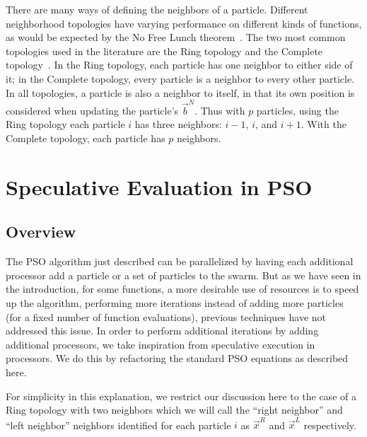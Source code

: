 \documentclass[journal,letterpaper]{IEEEtran}
\providecommand{\neigh}{\ensuremath{N}}
\providecommand{\leftind}{\ensuremath{L}}
\providecommand{\rightind}{\ensuremath{R}}
\providecommand{\nbest}{\ensuremath{\Vec{b}^\neigh}}
\providecommand{\leftn}{\ensuremath{\Vec{x}^\leftind}}
\providecommand{\rightn}{\ensuremath{\Vec{x}^\rightind}}
\begin{document}
There are many ways of defining the neighbors of a particle.  Different
neighborhood topologies have varying performance on different kinds of
functions, as would be expected by the No Free Lunch
theorem~\cite{wolpert-tec97}.
The two most common topologies used in the
literature are the Ring topology and the Complete
topology~\cite{bratton-sis07}.  In the Ring topology, each particle has one
neighbor to either side of it; in the Complete topology, every particle is a
neighbor to every other particle.  In all topologies, a particle is also a
neighbor to itself, in that its own position is considered when updating the
particle's $\nbest$.  Thus with $p$ particles, using the Ring topology each
particle $i$ has three neighbors: $i-1$, $i$, and $i+1$.  With the Complete
topology, each particle has $p$ neighbors.

\section{Speculative Evaluation in PSO}
\label{sec:sepso}
\subsection{Overview}

The PSO algorithm just described can be parallelized by having each additional
processor add a particle or a set of particles to the swarm.
But as we have seen in the introduction, for some
functions, a more desirable use of resources is to speed up the algorithm,
performing more iterations instead of adding more particles (for a fixed number of function evaluations),
previous techniques have not addressed this issue.
In order to perform additional iterations by adding additional processors, we
take inspiration from speculative execution in processors.
We do this by refactoring the standard PSO equations as described here.

For simplicity in this
explanation, we restrict our discussion here to the case of a Ring topology
with two neighbors which we will call the ``right neighbor'' and ``left
neighbor'' neighbors identified for each particle $i$ as $\rightn$ and $\leftn$
respectively.
\end{document}
